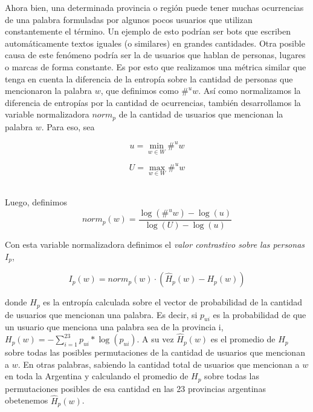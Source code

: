 Ahora bien, una determinada provincia o región puede tener muchas ocurrencias de una palabra formuladas por algunos pocos usuarios que utilizan constantemente el término. Un ejemplo de esto podrían ser bots que escriben automáticamente textos iguales (o similares) en grandes cantidades. Otra posible causa de este fenómeno podría ser la de usuarios que hablan de personas, lugares o marcas de forma constante.
Es por esto que realizamos una métrica similar que tenga en cuenta la diferencia de la entropía sobre la cantidad de personas que mencionaron la palabra $w$, que definimos como $\#^u w$. Así como normalizamos la diferencia de entropías por la cantidad de ocurrencias, también desarrollamos la variable normalizadora $norm_p$ de la cantidad de usuarios que mencionan la palabra $w$. 
Para eso, sea %

\noindent\begin{minipage}{.5\linewidth}
\begin{equation}
  u = \min \limits_{w \in W} \#^u w
\end{equation}
\end{minipage}%
\begin{minipage}{.5\linewidth}
\begin{equation}
  U = \max \limits_{w \in W} \#^u w
\end{equation}
\end{minipage}\\

Luego, definimos
\begin{equation}
norm_p(w) = \frac{\log\left(\#^u w\right) - \log \left(u\right)}{\log\left(U\right) - \log\left(u\right)}  
\label{eq:norm2}
\end{equation}

Con esta variable normalizadora definimos el \textit{valor contrastivo sobre las personas} $I_p$,

\begin{equation}
I_p(w) = norm_p(w) \cdot (\widehat{H}_p(w) - H_p(w))
\label{eq:iu}
\end{equation}

donde $H_p$ es la entropía calculada sobre el vector de probabilidad de la cantidad de usuarios que mencionan una palabra. Es decir, si $p_{ui}$ es la probabilidad de que un usuario que menciona una palabra sea de la provincia i, $H_p(w) =  -\sum\limits_{i=1}^{23} p_{ui} * \log(p_{ui})$. A su vez $\widehat{H}_p(w)$ es el promedio de $H_p$ sobre todas las posibles permutaciones de la cantidad de usuarios que mencionan a $w$. En otras palabras, sabiendo la cantidad total de usuarios que mencionan a $w$ en toda la Argentina y calculando el promedio de $H_p$ sobre todas las permutaciones posibles de esa cantidad en las 23 provincias argentinas obetenemos $\widehat{H}_p(w)$.

